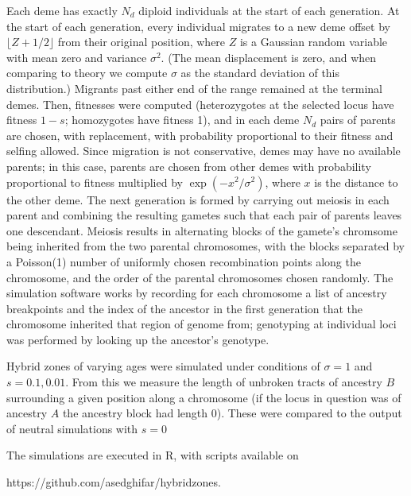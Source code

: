 \documentclass[11pt,letterpaper]{article}
\begin{document}
Each deme has exactly $N_d$ diploid individuals at the start of each generation.
At the start of each generation, every individual migrates to a new deme  offset by $\lfloor Z + 1/2 \rfloor$ from their original position,
where $Z$ is a Gaussian random variable with mean zero and variance $\sigma^2$.
(The mean displacement is zero, and when comparing to theory we compute $\sigma$ as the standard deviation of this distribution.)
Migrants past either end of the range remained at the terminal demes.
Then, 
fitnesses were computed (heterozygotes at the selected locus have fitness $1-s$; homozygotes have fitness 1),
and in each deme $N_d$ pairs of parents are chosen, with replacement,
with probability proportional to their fitness and selfing allowed.
Since migration is not conservative, demes may have no available parents;
in this case, parents are chosen from other demes with probability proportional to fitness
multiplied by $\exp(-x^2/\sigma^2)$, where $x$ is the distance to the other deme.
The next generation is formed by carrying out meiosis in each parent
and combining the resulting gametes such that each pair of parents leaves one descendant.
Meiosis results in alternating blocks of the gamete's chromsome
being inherited from the two parental chromosomes,
with the blocks separated by a Poisson(1) number of uniformly chosen recombination points along the chromosome,
and the order of the parental chromosomes chosen randomly.
The simulation software works by recording for each chromosome
a list of ancestry breakpoints and the index of the ancestor in the first generation
that the chromosome inherited that region of genome from;
genotyping at individual loci was performed by looking up the ancestor's genotype.

Hybrid zones of varying ages were simulated under conditions of $\sigma=1$ and $s=0.1,0.01$. From this we measure the length of unbroken tracts of ancestry $B$ surrounding a given position along a chromosome (if the locus in question was of ancestry $A$ the ancestry block had length $0$). These were compared to the output of neutral simulations with $s=0$

The simulations are executed in R, with scripts available on

 https://github.com/asedghifar/hybridzones.
\end{document}
